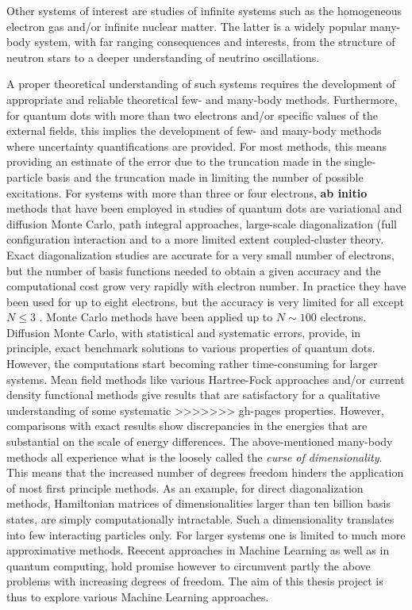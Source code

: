 \documentclass[%
oneside,                 %
final,                   %
10pt]{article}
\begin{document}
Other systems of interest are studies of infinite systems such as the
homogeneous electron gas and/or infinite nuclear matter.  The latter
is a widely popular many-body system, with far ranging consequences
and interests, from the structure of neutron stars to a deeper
understanding of neutrino oscillations.

A proper theoretical understanding of such systems requires the
development of appropriate and reliable theoretical few- and many-body
methods.  Furthermore, for quantum dots with more than two electrons
and/or specific values of the external fields, this implies the
development of few- and many-body methods where uncertainty
quantifications are provided.  For most methods, this means providing
an estimate of the error due to the truncation made in the
single-particle basis and the truncation made in limiting the number
of possible excitations.  For systems with more than three or four
electrons, \textbf{ab initio} methods that have been employed in studies of
quantum dots are variational and diffusion Monte Carlo, path integral
approaches, large-scale diagonalization (full configuration
interaction and to a more limited extent coupled-cluster theory.
Exact diagonalization studies are accurate for a very small number of
electrons, but the number of basis functions needed to obtain a given
accuracy and the computational cost grow very rapidly with electron
number.  In practice they have been used for up to eight electrons,
but the accuracy is very limited for all except $N\le 3$ .  Monte
Carlo methods have been applied up to $N\sim 100$ electrons. Diffusion
Monte Carlo, with statistical and systematic errors, provide, in
principle, exact benchmark solutions to various properties of quantum
dots. However, the computations start becoming rather time-consuming
for larger systems.  Mean field methods like various Hartree-Fock
approaches and/or current density functional methods give results that
are satisfactory for a qualitative understanding of some systematic
>>>>>>> gh-pages
properties. However, comparisons with exact results show discrepancies
in the energies that are substantial on the scale of energy
differences. The above-mentioned many-body methods all experience what
is the loosely called the \emph{curse of dimensionality}. This means that
the increased number of degrees freedom hinders the application of
most first principle methods. As an example, for direct
diagonalization methods, Hamiltonian matrices of dimensionalities
larger than ten billion basis states, are simply computationally
intractable. Such a dimensionality translates into few interacting
particles only. For larger systems one is limited to much more
approximative methods.  Reecent approaches in Machine Learning as well
as in quantum computing, hold promise however to circumvent partly the
above problems with increasing degrees of freedom.  The aim of this thesis project is
thus to explore various Machine Learning
approaches.
\end{document}
